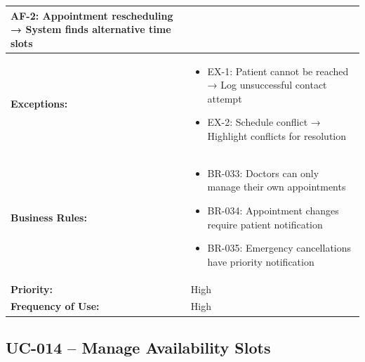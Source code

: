 \documentclass[12pt,a4paper]{article}
\begin{document}
\begin{longtable}{|p{4.5cm}|p{10.5cm}|}
\textbf{AF-2:} Appointment rescheduling → System finds alternative time slots \\
\hline
\textbf{Exceptions:} &
\begin{itemize}
  \item EX-1: Patient cannot be reached → Log unsuccessful contact attempt
  \item EX-2: Schedule conflict → Highlight conflicts for resolution
\end{itemize} \\
\hline
\textbf{Business Rules:} &
\begin{itemize}
  \item BR-033: Doctors can only manage their own appointments
  \item BR-034: Appointment changes require patient notification
  \item BR-035: Emergency cancellations have priority notification
\end{itemize} \\
\hline
\textbf{Priority:} & High \\
\hline
\textbf{Frequency of Use:} & High \\
\hline
\end{longtable}

\subsection{UC-014 – Manage Availability Slots}
\end{document}
